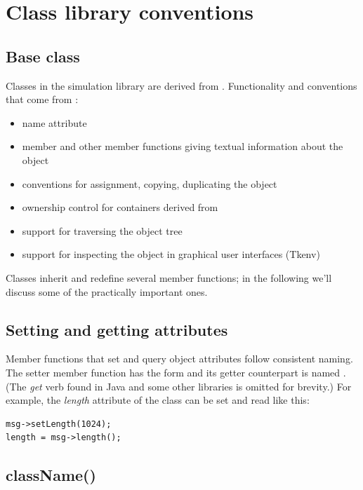 \section{Class library conventions}

\subsection{Base class}
\label{sec:ch-sim-lib:cobject}


Classes in the {\opp} simulation library are derived from .
Functionality and conventions that come from :
\begin{itemize}
  \item{name attribute}
  \item{ member and other member functions giving textual
    information about the object}
  \item{conventions for assignment, copying, duplicating the object}
  \item{ownership control for containers derived from }
  \item{support for traversing the object tree}
  \item{support for inspecting the object in graphical user interfaces (Tkenv)}
\end{itemize}


Classes inherit and redefine several  member functions;
in the following we'll discuss some of the practically important
ones.


\subsection{Setting and getting attributes}


Member functions that set and query object attributes follow
consistent naming. The setter member function has the form 
and its getter counterpart is named . (The \textit{get} verb found in Java
and some other libraries is omitted for brevity.)
For example, the \textit{length} attribute of the  class can
be set and read like this:

\begin{verbatim}
msg->setLength(1024);
length = msg->length();
\end{verbatim}


\subsection{className()}
\label{sec:sim-lib:classname}


